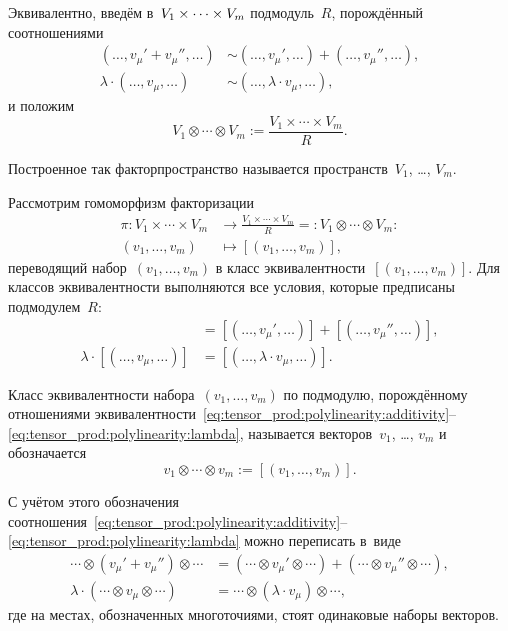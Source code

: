 Эквивалентно, введём в~$V_1 \times\cdots\times V_m$ подмодуль~$R$, порождённый соотношениями
\begin{align*}
	(\dots, v_\mu' + v_\mu'', \dots)
	&\sim
	(\dots, v_\mu', \dots) +
	(\dots, v_\mu'', \dots),
	\\
	\lambda \cdot
	(\dots, v_\mu, \dots)
	&\sim
	(\dots, \lambda \cdot v_\mu, \dots)
	,
\end{align*}
и положим
\[
	V_1 \otimes \cdots \otimes V_m
	:=
	\frac{
		V_1 \times \cdots \times V_m
	}{R}
	.
\]

Построенное так факторпространство называется  пространств~$V_1$, \dots, $V_m$.

Рассмотрим гомоморфизм факторизации
\begin{align*}
	\pi
	\colon
	V_1 \times \cdots \times V_m
	&\to
	\frac{
		V_1 \times \cdots \times V_m
	}{R}
	=:
	V_1 \otimes \cdots \otimes V_m
	\colon
	\\
	(v_1, \dots, v_m)
	&\mapsto
	[(v_1, \dots, v_m)]
	,
\end{align*}
переводящий набор~$(v_1, \dots, v_m)$ в класс эквивалентности~$[(v_1, \dots, v_m)]$. Для классов эквивалентности выполняются все условия, которые предписаны подмодулем~$R$:
\begin{align*}
	[(\dots, v_\mu' + v_\mu'', \dots)] &=
	[(\dots, v_\mu', \dots)] +
	[(\dots, v_\mu'', \dots)]
	,
	\\
	\lambda \cdot
	[(\dots, v_\mu, \dots)] &=
	[(\dots, \lambda \cdot v_\mu, \dots)]
	.
\end{align*}

\begin{definition}
	Класс эквивалентности набора~$(v_1, \dots, v_m)$ по подмодулю, порождённому отношениями эквивалентности~\eqref{eq:tensor_prod:polylinearity:additivity}--\eqref{eq:tensor_prod:polylinearity:lambda}, называется  векторов~$v_1$, \dots, $v_m$ и обозначается
	\[
		v_1 \otimes \cdots \otimes v_m
		:=
		[(v_1, \dots, v_m)]
		.
	\]
\end{definition}

С учётом этого обозначения соотношения~\eqref{eq:tensor_prod:polylinearity:additivity}--\eqref{eq:tensor_prod:polylinearity:lambda} можно переписать в~виде
\begin{align*}
	\cdots \otimes (v_\mu' + v_\mu'') \otimes \cdots &=
	(\cdots \otimes v_\mu' \otimes \cdots) +
	(\cdots \otimes v_\mu'' \otimes \cdots)
	,
	\\
	\lambda \cdot
	(\cdots \otimes v_\mu \otimes \cdots) &=
	\cdots \otimes (\lambda \cdot v_\mu) \otimes \cdots
	,
\end{align*}
где на местах, обозначенных многоточиями, стоят одинаковые наборы векторов.

